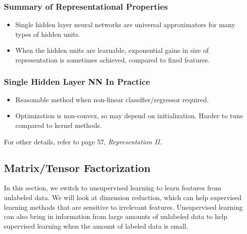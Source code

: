 \documentclass{article}
\begin{document}
   \subsubsection{Summary of Representational Properties}
   \begin{itemize}
   \item Single hidden layer neural networks are universal approximators for many types of hidden units.
   \item When the hidden units are learnable, exponential gains in size of representation is sometimes achieved, compared to fixed features.
   \end{itemize}
   
   \subsubsection{Single Hidden Layer NN In Practice}
   \begin{itemize}
   \item Reasonable method when non-linear classifier/regressor required.
   \item Optimization is non-convex, so may depend on initialization. Harder to tune compared to kernel methods.
   \end{itemize}
   For other details, refer to page 57, \textit{Representation II}.
   
   \subsection{Matrix/Tensor Factorization}
   In this section, we switch to unsupervised learning to learn features from unlabeled data. We will look at dimension reduction, which can help supervised learning methods that are sensitive to irrelevant features. Unsupervised learning can also bring in information from large amounts of unlabeled data to help supervised learning when the amount of labeled data is small.
   
\end{document}
